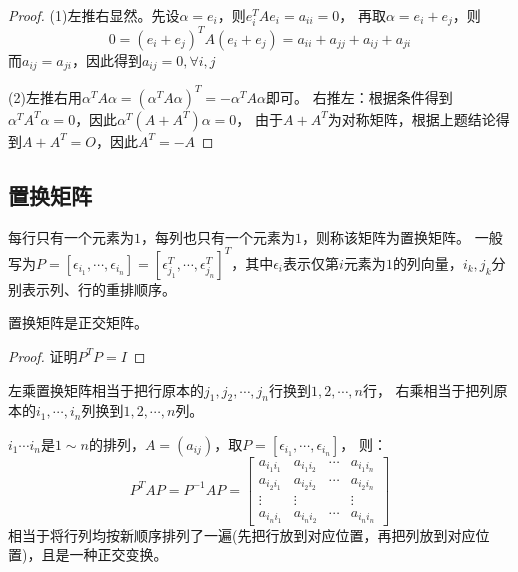 \begin{proof}
  (1)左推右显然。先设$\alpha = e_i$，则$e^T_i Ae_i = a_{ii} = 0$，
  再取$\alpha = e_i + e_j$，则
  \begin{equation*}
    0 = (e_i + e_j)^T A(e_i + e_j) = a_{ii}+a_{jj} + a_{ij} + a_{ji}
  \end{equation*}
  而$a_{ij} = a_{ji}$，因此得到$a_{ij }= 0, \forall i,j$

  (2)左推右用$\alpha^TA\alpha =  (\alpha^TA\alpha)^T = -\alpha^TA\alpha $即可。
  右推左：根据条件得到$\alpha^T A^T \alpha = 0$，因此$\alpha^T (A + A^T)\alpha = 0$，
  由于$A + A^T$为对称矩阵，根据上题结论得到$A + A^T = O$，因此$A^T = -A$
\end{proof}



\subsection{置换矩阵}

\begin{definition}[置换矩阵]
  每行只有一个元素为$1$，每列也只有一个元素为$1$，则称该矩阵为置换矩阵。
  一般写为$P = [\epsilon_{i_1},\cdots,\epsilon_{i_n}] = [\epsilon_{j_1}^T,\cdots,\epsilon_{j_n}^T]^T$，其中$\epsilon_i$表示仅第$i$元素为$1$的列向量，$i_k,j_k$分别表示列、行的重排顺序。
\end{definition}

\begin{theorem}[置换矩阵是正交矩阵]
  置换矩阵是正交矩阵。
\end{theorem}

\begin{proof}
  证明$P^TP = I$
\end{proof}

\begin{theorem}[置换矩阵的作用]
  左乘置换矩阵相当于把行原本的$j_1,j_2,\cdots,j_n$行换到$1,2,\cdots,n$行，
  右乘相当于把列原本的$i_1,\cdots,i_n$列换到$1,2,\cdots,n$列。
\end{theorem}

\begin{theorem}[置换矩阵正交相似]
  $i_1\cdots i_n$是$1 \sim n$的排列，$A = (a_{ij})$，取$P = [\epsilon_{i_1},\cdots,\epsilon_{i_n}]$，
  则：
  \begin{equation*}
    P^TAP =P^{-1}AP= \left[
      \begin{array}{cccc}
        a_{i_1i_1}&a_{i_1i_2}&\cdots&a_{i_1i_n}\\
        a_{i_2i_1}&a_{i_2i_2}&\cdots&a_{i_2i_n}\\
        \vdots&\vdots&&\vdots\\
        a_{i_ni_1}&a_{i_ni_2}&\cdots&a_{i_ni_n}
      \end{array}
    \right]
  \end{equation*}
  相当于将行列均按新顺序排列了一遍(先把行放到对应位置，再把列放到对应位置)，且是一种正交变换。
\end{theorem}

